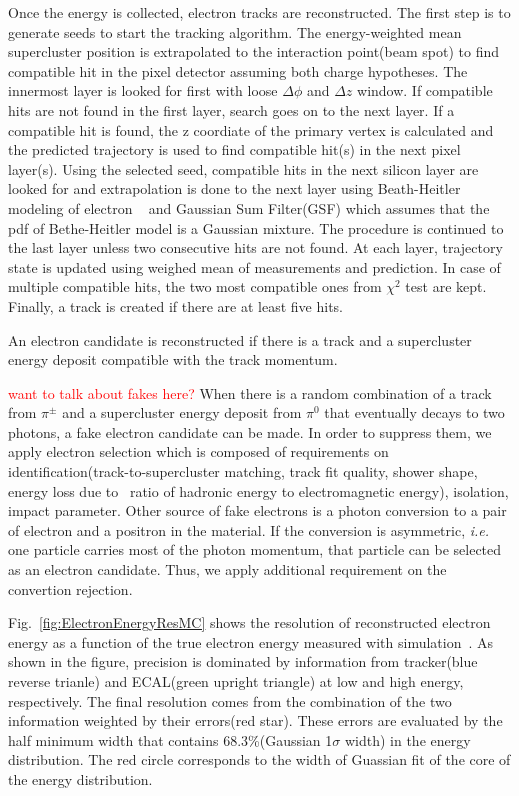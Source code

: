 Once the energy is collected, electron tracks are reconstructed. The first step is 
to generate seeds to start the tracking algorithm. The energy-weighted mean 
supercluster position is extrapolated to the interaction point(beam spot) 
to find compatible hit in the pixel detector assuming both charge hypotheses. 
The innermost layer is looked for first with loose $\Delta\phi$ and $\Delta z$ window. 
If compatible hits are not found in the first layer, search goes on to the next layer. 
If a compatible hit is found, the z coordiate of the primary vertex is calculated 
and the predicted trajectory is used to find compatible hit(s) in the next pixel layer(s).  
Using the selected seed, compatible hits in the next silicon layer are looked for  
and extrapolation is done to the next layer using Beath-Heitler modeling of electron 
\brem~\cite{BetheHeitler} 
and Gaussian Sum Filter(GSF) \cite{0954-3899-31-9-N01} which assumes that the pdf of 
Bethe-Heitler model is a Gaussian mixture. 
The procedure is continued to the last layer unless two consecutive hits are not found. 
At each layer, trajectory state is updated using weighed mean of measurements 
and prediction. In case of multiple compatible hits, the two most compatible ones 
from $\chi^2$ test are kept. Finally, a track is created if there are at least five hits. 

An electron candidate is reconstructed if there is a track and a supercluster energy deposit
compatible with the track momentum. 

\textcolor{red}{want to talk about fakes here?} 
When there is a random combination of 
a track from $\pi^\pm$ and a supercluster energy deposit from $\pi^0$ that eventually 
decays to two photons, a fake electron candidate can be made. 
In order to suppress them, we apply electron selection which is composed of 
requirements on identification(track-to-supercluster matching, 
track fit quality, shower shape, energy loss due to \brem\, ratio of hadronic energy
to electromagnetic energy), isolation, impact parameter.  
Other source of fake electrons is a photon conversion to a pair of electron and a positron 
in the material. If the conversion is asymmetric, \textit{i.e.} one particle carries 
most of the photon momentum, that particle can be selected as an electron 
candidate. Thus, we apply additional requirement on the convertion rejection.

Fig.~\ref{fig:ElectronEnergyResMC} shows the resolution of reconstructed electron energy 
as a function of the true electron energy measured with simulation~\cite{PAS-HIG-13-002}.   
As shown in the figure, precision is dominated by information from tracker(blue reverse 
trianle) and ECAL(green upright triangle) at low and high energy, respectively. 
The final resolution comes from the combination of the two information weighted by 
their errors(red star). These errors are evaluated by the half minimum width that 
contains 68.3\%(Gaussian 1$\sigma$ width) in the energy distribution. 
The red circle corresponds to the width of Guassian fit of the core of the 
energy distribution. 

